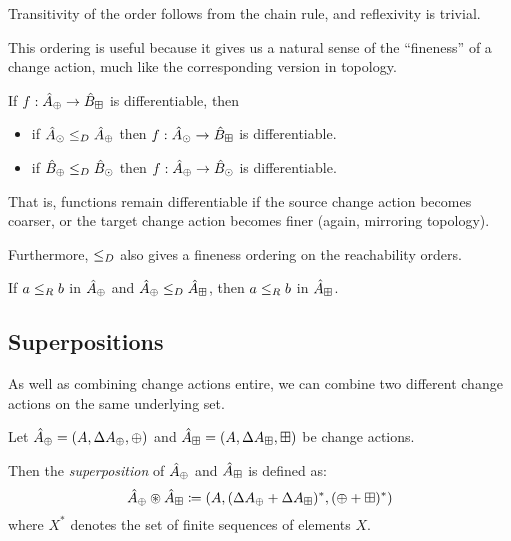 Transitivity of the order follows from the chain rule, and reflexivity is trivial.

This ordering is useful because it gives us a natural sense of the ``fineness''
of a change action, much like the corresponding version in topology.

\begin{prop}
  If $f: \hat{A}_\oplus \rightarrow \hat{B}_\boxplus$ is differentiable, then
  \begin{itemize}
    \item if $\hat{A}_\odot \leq_D \hat{A}_\oplus$ then $f: \hat{A}_\odot \rightarrow
      \hat{B}_\boxplus$ is differentiable.
    \item if $\hat{B}_\oplus \leq_D \hat{B}_\odot$ then $f: \hat{A}_\oplus \rightarrow
      \hat{B}_\odot$ is differentiable.
  \end{itemize}
\end{prop}

That is, functions remain differentiable if the source change action becomes
coarser, or the target change action becomes finer (again, mirroring topology).

Furthermore, $\leq_D$ also gives a fineness ordering on the reachability orders.

\begin{prop}
  If $a \leq_R b$ in $\hat{A}_\oplus$ and $\hat{A}_\oplus \leq_D \hat{A}_\boxplus$, then $a \leq_R b$ in $\hat{A}_\boxplus$.
\end{prop}

\subsection{Superpositions}

As well as combining change actions entire, we can combine two different
change actions on the same underlying set.

\begin{defn}[Superposition]
  Let $\hat{A}_\oplus = (A,\Delta A_\oplus,\oplus)$ and $\hat{A}_\boxplus =
  (A,\Delta A_\boxplus,\boxplus)$ be change actions.

  Then the \textit{superposition} of $\hat{A}_\oplus$ and $\hat{A}_\boxplus$ is defined as:
  $$\hat{A}_\oplus \circledast \hat{A}_\boxplus \coloneqq (A,
    (\Delta A_\oplus + \Delta A_\boxplus)^\ast,(\oplus + \boxplus)^\ast)$$
  where $X^\ast$ denotes the set of finite sequences of elements $X$.
\end{defn}

